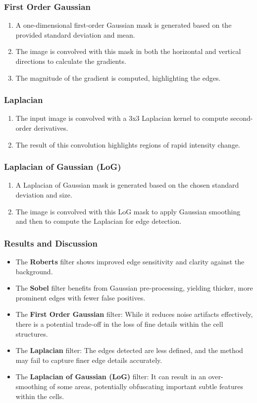 \documentclass[11pt]{article}
\begin{document}
\subsubsection*{First Order Gaussian}
\begin{enumerate}
    \item A one-dimensional first-order Gaussian mask is generated based on the provided standard deviation and mean.
    \item The image is convolved with this mask in both the horizontal and vertical directions to calculate the gradients.
    \item The magnitude of the gradient is computed, highlighting the edges.
\end{enumerate}

\subsubsection*{Laplacian}
\begin{enumerate}
    \item The input image is convolved with a 3x3 Laplacian kernel to compute second-order derivatives.
    \item The result of this convolution highlights regions of rapid intensity change.
\end{enumerate}

\subsubsection*{Laplacian of Gaussian (LoG)}
\begin{enumerate}
    \item A Laplacian of Gaussian mask is generated based on the chosen standard deviation and size.
    \item The image is convolved with this LoG mask to apply Gaussian smoothing and then to compute the Laplacian for edge detection.
\end{enumerate}


\subsubsection*{Results and Discussion}
\begin{itemize}
    \item The \textbf{Roberts} filter shows improved edge sensitivity and clarity against the background.
    \item The \textbf{Sobel} filter benefits from Gaussian pre-processing, yielding thicker, more prominent edges with fewer false positives.
    \item The \textbf{First Order Gaussian} filter: While it reduces noise artifacts effectively, there is a potential trade-off in the loss of fine details within the cell structures.
    \item The \textbf{Laplacian} filter: The edges detected are less defined, and the method may fail to capture finer edge details accurately.
    \item The \textbf{Laplacian of Gaussian (LoG)} filter: It can result in an over-smoothing of some areas, potentially obfuscating important subtle features within the cells.
\end{itemize}
\end{document}
